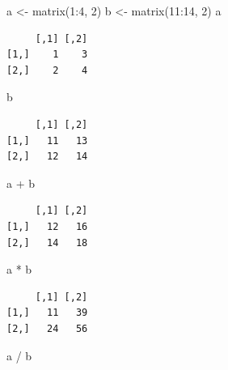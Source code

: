 \documentclass[
]{book}
\newenvironment{Shaded}{\begin{snugshade}}{\end{snugshade}}
\newcommand{\DecValTok}[1]{\textcolor[rgb]{0.00,0.00,0.81}{#1}}
\newcommand{\FunctionTok}[1]{\textcolor[rgb]{0.00,0.00,0.00}{#1}}
\newcommand{\NormalTok}[1]{#1}
\newcommand{\OtherTok}[1]{\textcolor[rgb]{0.56,0.35,0.01}{#1}}
\newcommand{\SpecialCharTok}[1]{\textcolor[rgb]{0.00,0.00,0.00}{#1}}
\begin{document}
\begin{Shaded}
\begin{Highlighting}[]
\NormalTok{a }\OtherTok{\textless{}{-}} \FunctionTok{matrix}\NormalTok{(}\DecValTok{1}\SpecialCharTok{:}\DecValTok{4}\NormalTok{, }\DecValTok{2}\NormalTok{)}
\NormalTok{b }\OtherTok{\textless{}{-}} \FunctionTok{matrix}\NormalTok{(}\DecValTok{11}\SpecialCharTok{:}\DecValTok{14}\NormalTok{, }\DecValTok{2}\NormalTok{)}
\NormalTok{a}
\end{Highlighting}
\end{Shaded}

\begin{verbatim}
     [,1] [,2]
[1,]    1    3
[2,]    2    4
\end{verbatim}

\begin{Shaded}
\begin{Highlighting}[]
\NormalTok{b}
\end{Highlighting}
\end{Shaded}

\begin{verbatim}
     [,1] [,2]
[1,]   11   13
[2,]   12   14
\end{verbatim}

\begin{Shaded}
\begin{Highlighting}[]
\NormalTok{a }\SpecialCharTok{+}\NormalTok{ b}
\end{Highlighting}
\end{Shaded}

\begin{verbatim}
     [,1] [,2]
[1,]   12   16
[2,]   14   18
\end{verbatim}

\begin{Shaded}
\begin{Highlighting}[]
\NormalTok{a }\SpecialCharTok{*}\NormalTok{ b}
\end{Highlighting}
\end{Shaded}

\begin{verbatim}
     [,1] [,2]
[1,]   11   39
[2,]   24   56
\end{verbatim}

\begin{Shaded}
\begin{Highlighting}[]
\NormalTok{a }\SpecialCharTok{/}\NormalTok{ b}
\end{Highlighting}
\end{Shaded}
\end{document}
